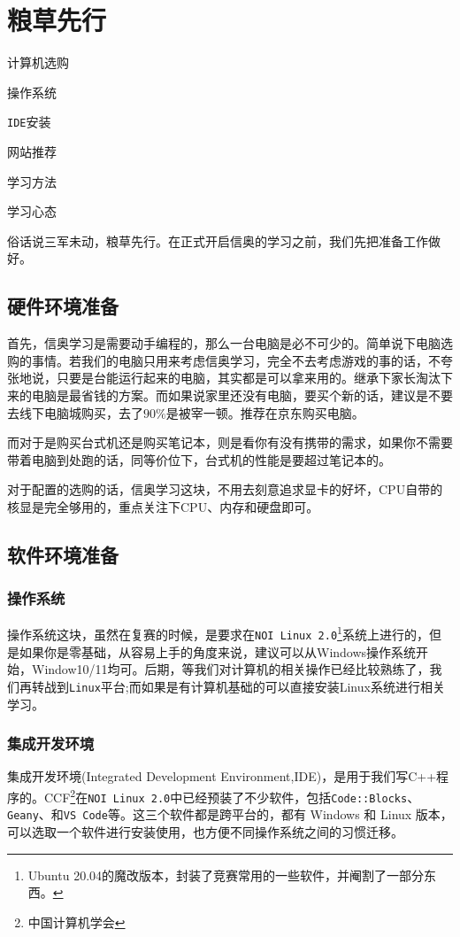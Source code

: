 \chapter{粮草先行}
\begin{introduction}
	\item 计算机选购
	\item 操作系统
	\item \texttt{IDE}安装
	\item 网站推荐
	\item 学习方法
	\item 学习心态
\end{introduction}

俗话说三军未动，粮草先行。在正式开启信奥的学习之前，我们先把准备工作做好。
\section{硬件环境准备}
首先，信奥学习是需要动手编程的，那么一台电脑是必不可少的。简单说下电脑选购的事情。若我们的电脑只用来考虑信奥学习，完全不去考虑游戏的事的话，不夸张地说，只要是台能运行起来的电脑，其实都是可以拿来用的。继承下家长淘汰下来的电脑是最省钱的方案。而如果说家里还没有电脑，要买个新的话，建议是不要去线下电脑城购买，去了$ 90\% $是被宰一顿。推荐在京东购买电脑。

而对于是购买台式机还是购买笔记本，则是看你有没有携带的需求，如果你不需要带着电脑到处跑的话，同等价位下，台式机的性能是要超过笔记本的。

对于配置的选购的话，信奥学习这块，不用去刻意追求显卡的好坏，CPU自带的核显是完全够用的，重点关注下CPU、内存和硬盘即可。
\section{软件环境准备}
\subsection{操作系统}
操作系统这块，虽然在复赛的时候，是要求在\texttt{NOI Linux 2.0}\footnote{Ubuntu 20.04的魔改版本，封装了竞赛常用的一些软件，并阉割了一部分东西。}系统上进行的，但是如果你是零基础，从容易上手的角度来说，建议可以从Windows操作系统开始，Window10/11均可。后期，等我们对计算机的相关操作已经比较熟练了，我们再转战到\texttt{Linux}平台;而如果是有计算机基础的可以直接安装Linux系统进行相关学习。
\subsection{集成开发环境}
集成开发环境(Integrated Development Environment,IDE)，是用于我们写C++程序的。CCF\footnote{中国计算机学会}在\texttt{NOI Linux 2.0}中已经预装了不少软件，包括\texttt{Code::Blocks}、\texttt{Geany}、和\texttt{VS Code}等。这三个软件都是跨平台的，都有 Windows 和 Linux 版本，可以选取一个软件进行安装使用，也方便不同操作系统之间的习惯迁移。

